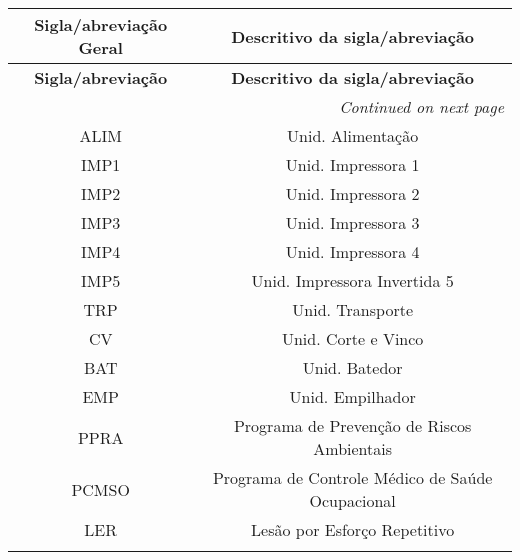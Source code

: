 \begin{longtable}{@{}c c@{}}
\textbf{Sigla/abreviação Geral} & \textbf{Descritivo da sigla/abreviação} \\
\midrule
\endfirsthead
\textbf{Sigla/abreviação} & \textbf{Descritivo da sigla/abreviação} \\
\midrule
\endhead
\midrule
\multicolumn{2}{r}{\textit{Continued on next page}}
\endfoot
\midrule
\endlastfoot

\gls{ALM} & Alarme \\
\addlinespace[0.2cm]

\gls{ALIM} & Unid. Alimentação  \\
\addlinespace[0.2cm]

\gls{IMP1} & Unid. Impressora 1 \\
\addlinespace[0.2cm]

\gls{IMP2} & Unid. Impressora 2 \\
\addlinespace[0.2cm]

\gls{IMP3} & Unid. Impressora 3 \\
\addlinespace[0.2cm]

\gls{IMP4} & Unid. Impressora 4 \\
\addlinespace[0.2cm]

\gls{IMP5} & Unid. Impressora Invertida 5 \\
\addlinespace[0.2cm]

\gls{TRP} & Unid. Transporte \\
\addlinespace[0.2cm]

\gls{CV} & Unid. Corte e Vinco \\
\addlinespace[0.2cm]

\gls{BAT} & Unid. Batedor \\
\addlinespace[0.2cm]

\gls{EMP} & Unid. Empilhador \\
\addlinespace[0.2cm]

\gls{PPRA} & Programa de Prevenção de Riscos Ambientais \\
\addlinespace[0.2cm]

\gls{PCMSO} & Programa de Controle Médico de Saúde Ocupacional \\
\addlinespace[0.2cm]

\gls{LER} & Lesão por Esforço Repetitivo \\
\addlinespace[0.2cm]

\end{longtable}

\newpage
\thispagestyle{fancy}
\vspace*{40 pt}


